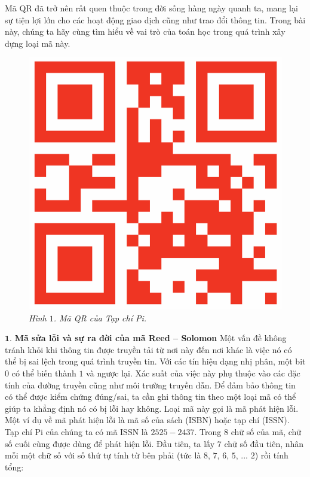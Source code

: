 \begin{multicols}{2}
	Mã QR đã trở nên rất quen thuộc trong đời sống hàng ngày quanh ta, mang lại sự tiện lợi lớn cho các hoạt động giao dịch cũng như trao đổi thông tin. Trong bài này, chúng ta hãy cùng tìm hiểu về vai trò của toán học trong quá trình xây dựng loại mã này.
	\begin{figure}[H]
		\vspace*{-5pt}
		\centering
		\captionsetup{labelformat= empty, justification=centering}
		\includegraphics[width= 1\linewidth]{1}
		\caption{\small\textit{\color{toanhocdoisong}Hình $1$. Mã QR của Tạp chí Pi.}}
		\vspace*{-10pt}
	\end{figure}
	$\pmb{1.}$ \textbf{\color{toanhocdoisong}Mã sửa lỗi và sự ra đời của mã Reed -- Solomon}
	\vskip 0.05cm
	Một vấn đề không tránh khỏi khi thông tin được truyền tải từ nơi này đến nơi khác là việc nó có thể bị sai lệch trong quá trình truyền tin. Với các tín hiệu dạng nhị phân, một bit $0$ có thể biến thành $1$ và ngược lại. Xác suất của việc này phụ thuộc vào các đặc tính của đường truyền cũng như môi trường truyền dẫn.
	\vskip 0.1cm
	Để đảm bảo thông tin có thể được kiểm chứng đúng/sai, ta cần ghi thông tin theo một loại mã có thể giúp ta khẳng định nó có bị lỗi hay không. Loại mã này gọi là mã phát hiện lỗi.
	\vskip 0.05cm
	Một ví dụ về mã phát hiện lỗi là mã số của sách (ISBN) hoặc tạp chí (ISSN). Tạp chí Pi của chúng ta có mã ISSN là $2525-2437$. Trong $8$ chữ số của mã, chữ số cuối cùng được dùng để phát hiện lỗi. Đầu tiên, ta lấy $7$ chữ số đầu tiên, nhân mỗi một chữ số với số thứ tự tính từ bên phải (tức là $8$, $7$, $6$, $5$, ... $2$) rồi tính tổng:

\end{multicols}
